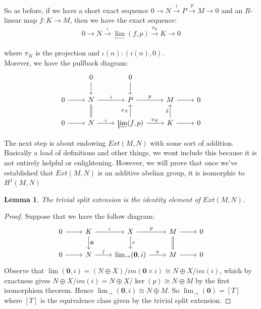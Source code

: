 \documentclass[12pt]{book}
\newtheorem{lemma}[theorem]{Lemma}
\theoremstyle{definition}
\begin{document}
So as before, if we have a short exact sequence $0 \rightarrow N \xrightarrow{i} P \xrightarrow{p} M \rightarrow 0$ and an $R$-linear map $f: K \to M$, then we have the exact sequence: 
\begin{align*}
    0 \rightarrow N \xrightarrow{\iota} \lim_{\leftarrow}(f,p) \xrightarrow{\pi_K} K \rightarrow 0
\end{align*}
 
where $\pi_K$ is the projection and $\iota(n) : (i(n),0)$.\\

Morever, we have the pullback diagram: 
\[
\begin{tikzcd}
    & 0 \arrow[d] & 0 \arrow[d] & & \\
    0 \arrow[r] & N \arrow[r, "i"] \arrow[d, equal] &P \arrow[r, "p"] & M \arrow[r] & 0 \\
    0 \arrow[r] & N \arrow[r, "\iota"] & \varprojlim(f, p) \arrow[u, "\pi_X"] \arrow[r, "\pi_K"] & K \arrow[u, "\delta"] \arrow[r] & 0
\end{tikzcd}
\]

    
The next step is about endowing $Ext(M,N)$ with some sort of addition. Basically a load of definitions and other things, we wont include this because it is not entirely helpful or enlightening. However, we will prove that once we've established that $Ext(M,N)$ is an additive abelian group, it is isomorphic to $H^1(M,N)$ 

\begin{lemma}
    The trivial split extension is the identity element of $Ext(M,N)$. 
\end{lemma}
\begin{proof}
    Suppose that we have the follow diagram: 
    \[
    \begin{tikzcd}
        0 \arrow[r] & K \arrow[r, "i"] \arrow[d, "\mathbf{0}"] & X \arrow[r, "p"] \arrow[d, "\nu"] & M \arrow[r] \arrow[d, equal] & 0\\
        0 \arrow[r] & N \arrow[r, "j"] & \lim_\rightarrow (\mathbf{0}, i) \arrow[r, "\pi"] & M \arrow[r] & 0
    \end{tikzcd}
    \]
    Observe that $\lim(\mathbf{0}, i) = (N \oplus X)/im(\mathbf{0} \times i) \cong N \oplus X/im(i)$, which by exactness gives $N \oplus X/im(i) = N \oplus X/\ker(p) \cong N \oplus M$ by the first isomorphism theorem. Hence $\lim_\rightarrow(\mathbf{0}, i) \cong N \oplus M$. So $\lim_{\rightarrow}(\mathbf{0}) = [T]$ where $[T]$ is the equivalence class given by the trivial split extension. 
\end{proof}
\end{document}
